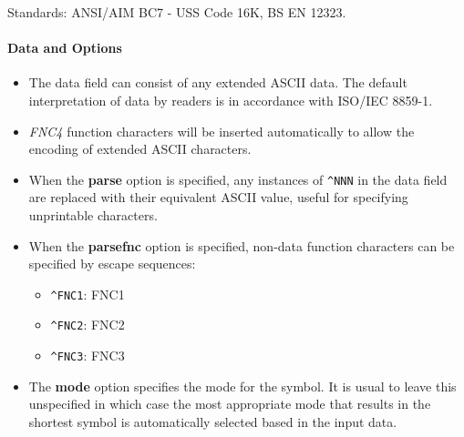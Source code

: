 Standards: ANSI/AIM BC7 - USS Code 16K, BS EN 12323.

\hypertarget{data-and-options-64}{%
\paragraph{Data and Options}\label{data-and-options-64}}

\begin{itemize}
\tightlist
\item
  The data field can consist of any extended ASCII data. The default
  interpretation of data by readers is in accordance with ISO/IEC
  8859-1.
\item
  \emph{FNC4} function characters will be inserted automatically to
  allow the encoding of extended ASCII characters.
\item
  When the \textbf{parse} option is specified, any instances of
  \texttt{\^{}NNN} in the data field are replaced with their equivalent
  ASCII value, useful for specifying unprintable characters.
\item
  When the \textbf{parsefnc} option is specified, non-data function
  characters can be specified by escape sequences:

  \begin{itemize}
  \tightlist
  \item
    \texttt{\^{}FNC1}: FNC1
  \item
    \texttt{\^{}FNC2}: FNC2
  \item
    \texttt{\^{}FNC3}: FNC3
  \end{itemize}
\item
  The \textbf{mode} option specifies the mode for the symbol. It is
  usual to leave this unspecified in which case the most appropriate
  mode that results in the shortest symbol is automatically selected
  based in the input data.


\end{itemize}
